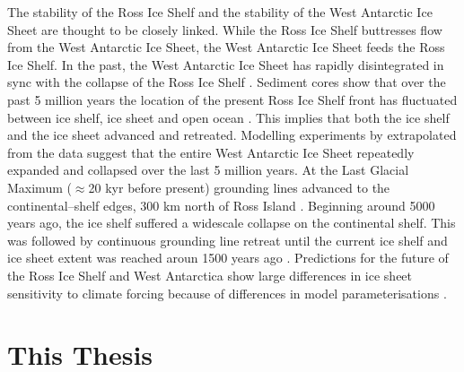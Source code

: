 The stability of the Ross Ice Shelf and the stability of the West Antarctic Ice Sheet are thought to be closely linked. While the Ross Ice Shelf buttresses flow from the West Antarctic Ice Sheet, the West Antarctic Ice Sheet feeds the Ross Ice Shelf. In the past, the West Antarctic Ice Sheet has rapidly disintegrated in sync with the collapse of the Ross Ice Shelf \citep{pollard2009modelling}. 
Sediment cores  show that over the past 5 million years the location of the present Ross Ice Shelf front has fluctuated between ice shelf, ice sheet and open ocean \citep{naish2009obliquity}. This implies that both the ice shelf and the ice sheet advanced and retreated.
Modelling experiments by \cite{pollard2009modelling} extrapolated from the \cite{naish2009obliquity} data suggest that the entire West Antarctic Ice Sheet repeatedly expanded and collapsed over the last 5 million years.
At the Last Glacial Maximum ($\approx$20 kyr before present) grounding lines advanced to the continental--shelf edges, 300 km north of Ross Island  \citep{mckay2008retreat} .
Beginning around 5000 years ago, the ice shelf suffered a widescale collapse  on the continental shelf. This was followed by continuous grounding line retreat until the current ice shelf and ice sheet extent was reached aroun 1500 years ago \citep{yokoyama2016widespread}. 
Predictions for the future of the Ross Ice Shelf and West Antarctica show large differences in ice sheet sensitivity to climate forcing because of differences in model parameterisations \citep{deconto2016contribution,golledge2015multi,edwards2021projected}.

\section{This Thesis}

